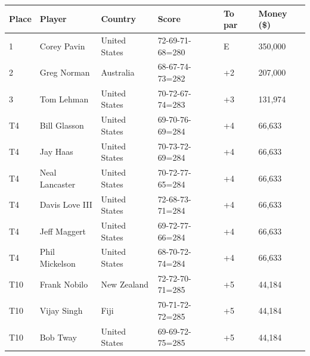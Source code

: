 \documentclass{article}
\begin{document}
\begin{tabular}{llllll}
\toprule
Place & Player & Country & Score & To par & Money (\$) \\
\midrule
1 & Corey Pavin & United States & 72-69-71-68=280 & E & 350,000 \\
2 & Greg Norman & Australia & 68-67-74-73=282 & +2 & 207,000 \\
3 & Tom Lehman & United States & 70-72-67-74=283 & +3 & 131,974 \\
T4 & Bill Glasson & United States & 69-70-76-69=284 & +4 & 66,633 \\
T4 & Jay Haas & United States & 70-73-72-69=284 & +4 & 66,633 \\
T4 & Neal Lancaster & United States & 70-72-77-65=284 & +4 & 66,633 \\
T4 & Davis Love III & United States & 72-68-73-71=284 & +4 & 66,633 \\
T4 & Jeff Maggert & United States & 69-72-77-66=284 & +4 & 66,633 \\
T4 & Phil Mickelson & United States & 68-70-72-74=284 & +4 & 66,633 \\
T10 & Frank Nobilo & New Zealand & 72-72-70-71=285 & +5 & 44,184 \\
T10 & Vijay Singh & Fiji & 70-71-72-72=285 & +5 & 44,184 \\
T10 & Bob Tway & United States & 69-69-72-75=285 & +5 & 44,184 \\
\bottomrule
\end{tabular}
\end{document}
